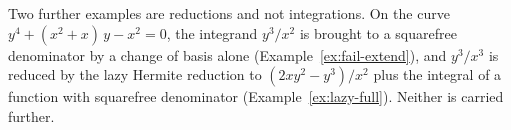 Two further examples are reductions and not integrations. On the curve $y^4 +
(x^2 + x)\,y - x^2 = 0$, the integrand $y^3/x^2$ is brought to a squarefree
denominator by a change of basis alone (Example~\ref{ex:fail-extend}), and
$y^3/x^3$ is reduced by the lazy Hermite reduction to $(2xy^2 - y^3)/x^2$
plus the integral of a function with squarefree denominator
(Example~\ref{ex:lazy-full}). Neither is carried further.
